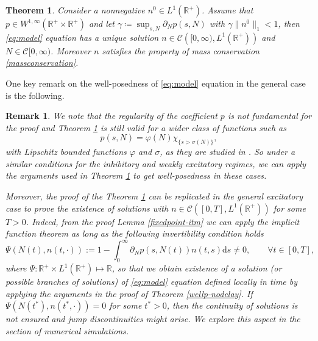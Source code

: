 \documentclass[11pt,a4paper]{article}
\newcommand{\R}{\mathbb{R}}
\newcommand{\dd}{\mathrm{d}}
\newtheorem{theorem}{Theorem}[section]
\newtheorem{remark}{Remark}[section]
\begin{document}
\begin{theorem}
\label{wellp-nodelay}
     Consider a nonnegative $n^0\in L^1(\R^+)$. Assume that $p\in W^{1,\infty}(\R^+\times\R^+)$ and let $\gamma \coloneqq \sup_{s,N}\partial_N p(s,N)$ with $\gamma\|n^0\|_1<1$, then \eqref{eq:model} equation has a unique solution $n\in \mathcal{C}\left([0,\infty),L^1(\R^+)\right)$ and $N\in\mathcal{C}[0,\infty)$. Moreover $n$ satisfies the property of mass conservation \eqref{massconservation}.
\end{theorem}

One key remark on the well-posedness of \eqref{eq:model} equation in the general case is the following. 

\begin{remark}
    We note that the regularity of the coefficient $p$ is not fundamental for the proof and Theorem \ref{wellp-nodelay} is still valid for a wider class of functions such as 
  \begin{equation*}
  p(s,N)=\varphi(N)\chi_{\{s>\sigma(N)\}},      
  \end{equation*}
with Lipschitz bounded functions $\varphi$ and $\sigma$, as they are studied in \cite{pakdaman2009dynamics,torres2021elapsed}. So under a similar conditions for the inhibitory and weakly excitatory regimes, we can apply the arguments used in Theorem \ref{wellp-nodelay} to get well-posedness in these cases.

    Moreover, the proof of the Theorem \ref{wellp-nodelay} can be replicated in the general excitatory case to prove the existence of solutions with $n\in\mathcal{C}\left([0,T],L^1(\R^+)\right)$ for some $T>0$. Indeed, from the proof Lemma \ref{fixedpoint-itm} we can apply the implicit function theorem as long as the following invertibility condition holds
    \begin{equation}\label{cond:inverti}
     \Psi(N(t),n(t,\cdot)):= 1-\int_0^\infty \partial_N p(s,N(t))n(t,s)\dd s  \neq 0,\qquad\forall t\in [0,T],  
    \end{equation}
    where $\Psi:\R^+\times L^1(\R^+)\longmapsto\R$,
    so that we obtain existence of a solution (or possible branches of solutions) of \eqref{eq:model} equation defined locally in time by applying the arguments in the proof of Theorem \eqref{wellp-nodelay}. If $\Psi(N(t^*),n(t^*,\cdot))=0$ for some $t^*>0$, then the continuity of solutions is not ensured and jump discontinuities might arise. We explore this aspect in the section of numerical simulations.
\end{remark}
\end{document}
